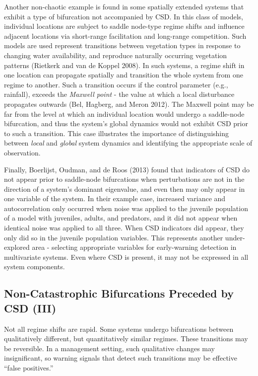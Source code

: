 \documentclass[author-year, review]{elsarticle} %
\begin{document}
Another non-chaotic example is found in some spatially extended systems
that exhibit a type of bifurcation not accompanied by CSD. In this class
of models, individual locations are subject to saddle node-type regime
shifts and influence adjacent locations via short-range facilitation and
long-range competition. Such models are used represent transitions
between vegetation types in response to changing water availability, and
reproduce naturally occurring vegetation patterns (Rietkerk and van de
Koppel 2008). In such systems, a regime shift in one location can
propagate spatially and transition the whole system from one regime to
another. Such a transition occurs if the control parameter (e.g.,
rainfall), exceeds the \emph{Maxwell point} - the value at which a local
disturbance propagates outwards (Bel, Hagberg, and Meron 2012). The
Maxwell point may be far from the level at which an individual location
would undergo a saddle-node bifurcation, and thus the system's global
dynamics would not exhibit CSD prior to such a transition. This case
illustrates the importance of distinguishing between \emph{local} and
\emph{global} system dynamics and identifying the appropriate scale of
observation.

Finally, Boerlijst, Oudman, and de Roos (2013) found that indicators of
CSD do not appear prior to saddle-node bifurcations when perturbations
are not in the direction of a system's dominant eigenvalue, and even
then may only appear in one variable of the system. In their example
case, increased variance and autocorrelation only occurred when noise
was applied to the juvenile population of a model with juveniles,
adults, and predators, and it did not appear when identical noise was
applied to all three. When CSD indicators did appear, they only did so
in the juvenile population variables. This represents another
under-explored area - selecting appropriate variables for early-warning
detection in multivariate systems. Even where CSD is present, it may not
be expressed in all system components.

\subsection{Non-Catastrophic Bifurcations Preceded by CSD (III)}

Not all regime shifts are rapid. Some systems undergo bifurcations
between qualitatively different, but quantitatively similar regimes.
These transitions may be reversible. In a management setting, such
qualitative changes may insignificant, so warning signals that detect
such transitions may be effective ``false positives.''
\end{document}
